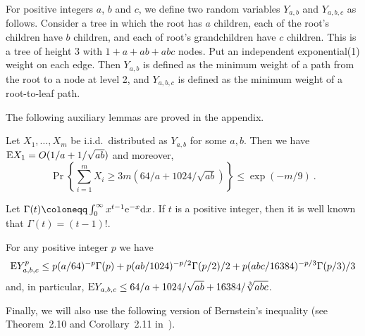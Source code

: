 \documentclass{patmorin}
\DeclareMathOperator{\erlang}{Erlang}
\newcommand{\abas}[1]{\textcolor{orange}{\big[Abbas: #1\big]}}
\begin{document}

For positive integers $a$, $b$ and $c$, we define two random variables $Y_{a,b}$  and $Y_{a,b,c}$ as follows.
Consider a tree in which the root has $a$ children,
 each of the root's children have $b$ children,
and each of root's grandchildren have $c$ children.
This is a tree of height 3 with
$1 + a + ab + abc$ nodes. 
Put an independent exponential(1) weight on each edge.
Then $Y_{a,b}$ is defined as the minimum weight of a path from the root to a node at level 2,
and $Y_{a,b,c}$ is defined as the minimum weight of a root-to-leaf path.

The following auxiliary lemmas are proved in the appendix.

\begin{lem}
Let $X_1,\dots,X_m$ be i.i.d.\ distributed as $Y_{a,b}$ for some $a,b$.
Then we have
$\mathrm{E} X_1 =O(1/a+1/\sqrt{ab})$ and moreover,
\[
\Pr\left\{\sum_{i=1}^m X_i \geq 3 m (64/a + 1024/\sqrt{ab}) \right\}
\leq
\exp(-m/9)\:.
\]
\end{lem}

Let 
$\Gamma(t) \coloneqq \int_0^\infty x^{t-1} {\rm e}^{-x} \mathrm{d} x$.
If $t$ is a positive integer, then it is well known that $\Gamma(t)=(t-1)!$.

\begin{lem}
For any positive integer $p$ we have
\[
\mathrm{E} Y_{a,b,c}^p \leq
 p (a/64)^{-p}\Gamma(p)
+ p(ab/1024)^{-p/2}\Gamma(p/2)/2
+ p(abc/16384)^{-p/3}\Gamma(p/3)/3
\]
and, in particular,
$\mathrm{E} Y_{a,b,c} \leq 64/a+1024/\sqrt{ab} + 16384/\sqrt[3]{abc}$.
\end{lem}

Finally, we will also use the following
version of Bernstein's inequality (see Theorem~2.10 and Corollary~2.11 in~\cite{boucheron2013concentration}).

\end{document}
